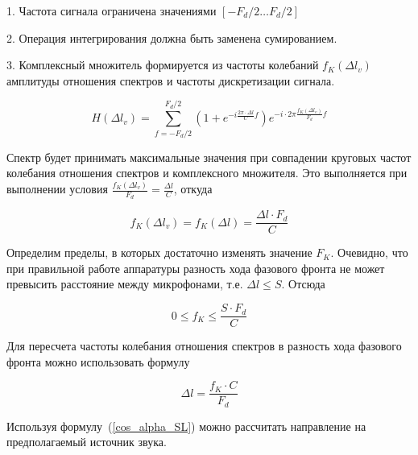 \documentclass[fleqn,10pt,a4paper]{article}
\begin{document}
1. Частота сигнала ограничена значениями $\left[-F_d/2\dots{}F_d/2\right]$

2. Операция интегрирования должна быть заменена сумированием.

3. Комплексный множитель формируется из частоты колебаний
$f_K\left(\Delta{}l_v\right)$ амплитуды отношения спектров и частоты
дискретизации сигнала.

\begin{equation*}
	H(\Delta{}l_v) = \sum_{f=-F_d/2}^{F_d/2}
	\left(1+e^{-i\frac{2\pi{}\cdot\Delta{}l}{C}f}\right) 
	e^{-i\cdot{}2\pi{}\frac{f_K\left(\Delta{}l_v\right)}{F_d} f}
\end{equation*}

Спектр будет принимать максимальные значения при совпадении круговых частот
колебания отношения спектров и комплексного множителя. Это выполняется при
выполнении условия
$\frac{f_K\left(\Delta{}l_v\right)}{F_d}=\frac{\Delta{}l}{C}$, откуда

\begin{equation*}
	f_K\left(\Delta{}l_v\right)=f_K\left(\Delta{}l\right)=\frac{\Delta{}l\cdot{}F_d}{C}
\end{equation*}

Определим пределы, в которых достаточно изменять значение $F_K$. Очевидно, что
при правильной работе аппаратуры разность хода фазового фронта не может
превысить расстояние между микрофонами, т.е. $\Delta{}l\le{}S$. Отсюда

\begin{equation*}
	0\le{}f_K\le\frac{S\cdot{}F_d}{C}
\end{equation*}

Для пересчета частоты колебания отношения спектров в разность хода фазового
фронта можно использовать формулу

\begin{equation*}
	\Delta{}l = \frac{f_K\cdot{}C}{F_d}
\end{equation*}

Используя формулу~(\ref{cos_alpha_SL}) можно рассчитать направление на
предполагаемый источник звука.
\end{document}
